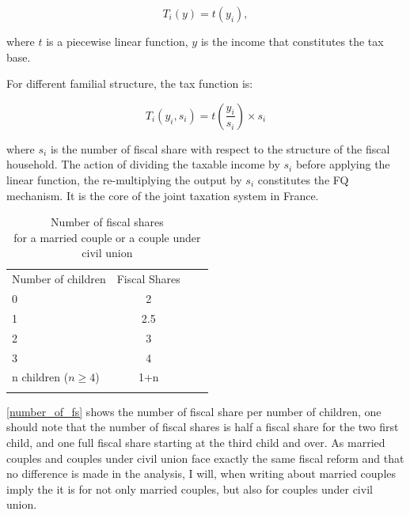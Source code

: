  \[ T_i(y) = t(y_i),\]

 where $t$ is a piecewise linear function, $y$ is the income that constitutes the tax base.

 For different familial structure, the tax function is: 

 \[ T_i(y_i,s_i) = t\left(\frac{y_i}{s_i}\right) \times s_i \]

 where $s_i$ is the number of fiscal share with respect to the structure of the fiscal household. The action of dividing the taxable income by $s_i$ before applying the linear function, the re-multiplying the output by $s_i$ constitutes the FQ mechanism. It is the core of the joint taxation system in France. 

 \begin{table}[H]
   \caption{Number of fiscal shares\\ for a married couple or a couple under civil union}
   \label{number_of_fs}
 \centering


 \label{table}
 \begin{tabular}{lccc}
 \toprule
 Number of children & Fiscal Shares \\
 \hdrule

 0  & 2 \\
 1  & 2.5\\
 2 & 3\\
 3 & 4 \\
 n children ($n\geq4$)  & 1+n  \\

 \addlinespace[5pt]
 \bottomrule
 \end{tabular}
 \end{table}
 
 \autoref{number_of_fs} shows the number of fiscal share per number of children, one should note that the number of fiscal shares is half a fiscal share for the two first child, and one full fiscal share starting at the third child and over.
\medskip
As married couples and couples under civil union face exactly the same fiscal reform and that no difference is made in the analysis, I will, when writing about married couples imply the it is for not only married couples, but also for couples under civil union.







%



